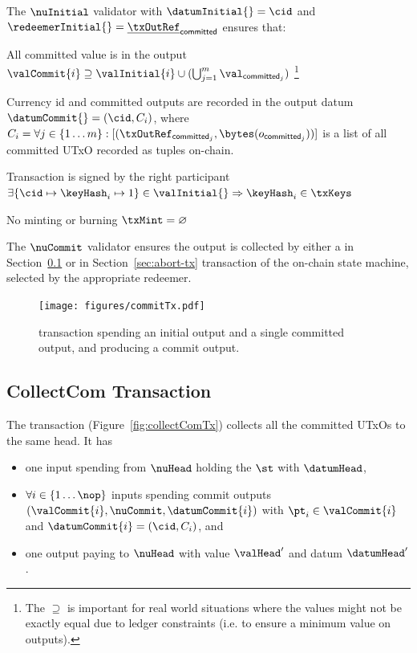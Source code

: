 \noindent The $\nuInitial$ validator with $\datumInitial{} = \cid$ and
$\redeemerInitial{} = \underline{\txOutRef}_{\mathsf{committed}}$ ensures that:
\begin{menumerate}
	\item All committed value is in the output
	$\valCommit{i} \supseteq \valInitial{i} \cup (\bigcup_{j=1}^{m} \val_{\mathsf{committed}_{j}})$
	\footnote{The $\supseteq$ is important for real world situations where the values
		might not be exactly equal due to ledger constraints (i.e. to ensure a
		minimum value on outputs).}
	\item Currency id and committed outputs are recorded in the output datum
	$\datumCommit{} = (\cid, C_{i})$, where
	$C_{i} = \forall j \in \{1 \dots m\} : [(\txOutRef_{\mathsf{committed}_{j}},\bytes(o_{\mathsf{committed}_{j}}))]$
	is a list of all committed UTxO recorded as tuples on-chain.
	\item Transaction is signed by the right participant
	$\exists \{\cid \mapsto \keyHash_{i} \mapsto 1\} \in \valInitial{} \Rightarrow \keyHash_{i} \in \txKeys$
	\item No minting or burning $\txMint = \varnothing$
\end{menumerate}

\noindent The $\nuCommit$ validator ensures the output is collected by either a
\mtxCCom{} in Section~\ref{sec:collect-tx} or \mtxAbort{} in
Section~\ref{sec:abort-tx} transaction of the on-chain state machine, selected
by the appropriate redeemer.

\begin{figure}[h] \centering
	\texttt{[image: figures/commitTx.pdf]}
	\caption{\mtxCom{} transaction spending an initial output and a single
		committed output, and producing a commit output.}\label{fig:commitTx}
\end{figure}

\subsection{CollectCom Transaction}\label{sec:collect-tx}

\noindent The \mtxCCom{} transaction (Figure~\ref{fig:collectComTx}) collects
all the committed UTxOs to the same head. It has
\begin{itemize}
	\item one input spending from $\nuHead$ holding the $\st$ with $\datumHead$,
	\item $\forall i \in \{1 \dots \nop\}$ inputs spending commit outputs
	      $(\valCommit{i}, \nuCommit, \datumCommit{i})$ with $\pt_{i} \in \valCommit{i}$
	      and $\datumCommit{i} = (\cid, C_{i})$, and
	\item one output paying to $\nuHead$ with value $\valHead'$ and
	      datum $\datumHead'$.
\end{itemize}

